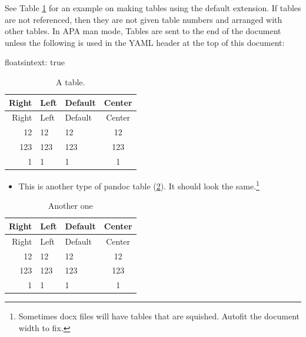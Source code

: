 \documentclass[man,longtable,noextraspace,floatsintext]{apa6}
\let\tightlist\relax %
\newenvironment{Shaded}{}{}
\newcommand{\AttributeTok}[1]{\textcolor[rgb]{0.49,0.56,0.16}{#1}}
\newcommand{\FunctionTok}[1]{\textcolor[rgb]{0.02,0.16,0.49}{#1}}
\begin{document}
See Table \ref{tbl:mytable} for an example on making tables using the
default extension. If tables are not referenced, then they are not given
table numbers and arranged with other tables. In APA man mode, Tables
are sent to the end of the document unless the following is used in the
YAML header at the top of this document:

\begin{Shaded}
\begin{Highlighting}[]
\FunctionTok{floatsintext:}\AttributeTok{ true}
\end{Highlighting}
\end{Shaded}

\begin{longtable}[]{@{}rllc@{}}
\caption{A table. \label{tbl:mytable}}\tabularnewline
\toprule
Right & Left & Default & Center\tabularnewline
\midrule
\endfirsthead
\toprule
Right & Left & Default & Center\tabularnewline
\midrule
\endhead
12 & 12 & 12 & 12\tabularnewline
123 & 123 & 123 & 123\tabularnewline
1 & 1 & 1 & 1\tabularnewline
\bottomrule
\end{longtable}

\begin{itemize}
\tightlist
\item
  This is another type of pandoc table (\ref{tbl:anotherone}). It should
  look the same.\footnote{Sometimes docx files will have tables that are
    squished. Autofit the document width to fix.}
\end{itemize}

\begin{longtable}[]{@{}rllc@{}}
\caption{Another one \label{tbl:anotherone}}\tabularnewline
\toprule
Right & Left & Default & Center\tabularnewline
\midrule
\endfirsthead
\toprule
Right & Left & Default & Center\tabularnewline
\midrule
\endhead
12 & 12 & 12 & 12\tabularnewline
123 & 123 & 123 & 123\tabularnewline
1 & 1 & 1 & 1\tabularnewline
\bottomrule
\end{longtable}

\newpage
\end{document}
